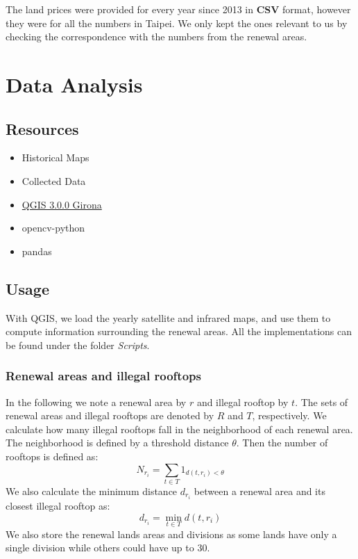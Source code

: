 \documentclass[12pt]{article}
\begin{document}
The land prices were provided for every year since 2013 in \textbf{CSV} format, however they were for all the numbers in Taipei. We only kept the ones relevant to us by checking the correspondence with the numbers from the renewal areas.

\section{Data Analysis}

\subsection{Resources}
\begin{itemize}
\item Historical Maps
\item Collected Data
\item \href{https://qgis.org/en/site/}{QGIS 3.0.0 Girona}
\item opencv-python
\item pandas
\end{itemize}

\subsection{Usage}
With QGIS, we load the yearly satellite and infrared maps, and use them to compute information surrounding the renewal areas. All the implementations can be found under the folder \textit{Scripts}.

\subsubsection{Renewal areas and illegal rooftops}
In the following we note a renewal area by $r$ and illegal rooftop by $t$. The sets of renewal areas and illegal rooftops are denoted by $R$ and $T$, respectively.
We calculate how many illegal rooftops fall in the neighborhood of each renewal area. The neighborhood is defined by a threshold distance $\theta$. Then the number of rooftops is defined as:
\begin{equation}
	N_{r_i} = \sum_{t \in T} 1_{d(t, r_i) < \theta}
\end{equation}
We also calculate the minimum distance $d_{r_i}$ between a renewal area and its closest illegal rooftop as:
\begin{equation}
	d_{r_i} = \min_{t \in T} d(t, r_i)
\end{equation}
We also store the renewal lands areas and divisions as some lands have only a single division while others could have up to 30.
\end{document}
